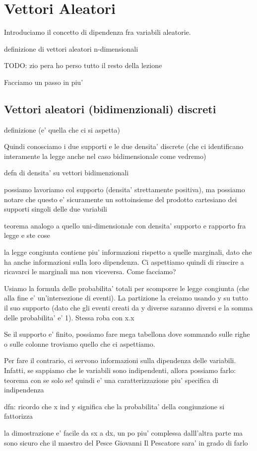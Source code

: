 % 
\chapter{Vettori Aleatori}
Introduciamo il concetto di dipendenza fra variabili aleatorie. 

definizione di vettori aleatori n-dimensionali

TODO: zio pera ho perso tutto il resto della lezione

Facciamo un passo in piu' 

\section{Vettori aleatori (bidimenzionali) discreti}

definizione (e' quella che ci si aspetta)

Quindi conosciamo i due supporti e le due densita' discrete (che ci identificano interamente la legge anche nel caso bidimensionale come vedremo)

defn di densita' su vettori bidimenzionali

possiamo lavoriamo col supporto (densita' strettamente positiva), ma possiamo notare che questo e' sicuramente un sottoinsieme del prodotto cartesiano dei supporti singoli delle due variabili

teorema analogo a quello uni-dimensionale con densita' supporto e rapporto fra legge e ste cose

la legge congiunta contiene piu' informazioni rispetto a quelle marginali, dato che ha anche informazioni sulla loro dipendenza. Ci aspettiamo quindi di riuscire a ricavarci le marginali ma non viceversa. Come facciamo?

Usiamo la formula delle probabilita' totali per scomporre le legge congiunta (che alla fine e' un'intersezione di eventi). La partizione la creiamo usando y su tutto il suo supporto (dato che gli eventi creati da y diverse saranno diversi e la somma delle probabilita' e' 1). Stessa roba con x.x

Se il supporto e' finito, possiamo fare mega tabellona dove sommando sulle righe o sulle colonne troviamo quello che ci aspettiamo. 

Per fare il contrario, ci servono informazioni sulla dipendenza delle variabili. Infatti, se sappiamo che le variabili sono indipendenti, allora possiamo farlo: teorema con se solo se! quindi e' una caratterizzazione piu' specifica di indipendenza

dfn:
ricordo che x ind y significa che la probabilita' della congiunzione si fattorizza

la dimostrazione e' facile da sx a dx, un po piu' complessa dalll'altra parte ma sono sicuro che il maestro del Pesce Giovanni Il Pescatore sara' in grado di farlo


% 
